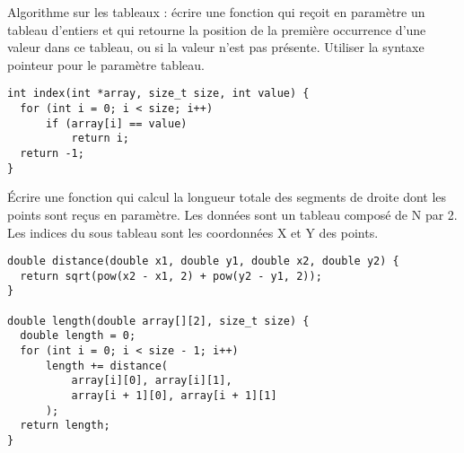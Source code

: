 \documentclass[french,a4paper,addpoints,11pt]{exam}
\begin{document}
\begin{questions}
\question Algorithme sur les tableaux : écrire une fonction qui reçoit en paramètre un tableau d'entiers et qui retourne la position de la première occurrence d'une valeur dans ce tableau, ou  si la valeur n'est pas présente. Utiliser la syntaxe pointeur pour le paramètre tableau.

\ifprintanswers
\begin{solution}
\begin{lstlisting}
int index(int *array, size_t size, int value) {
  for (int i = 0; i < size; i++)
      if (array[i] == value)
          return i;
  return -1;
}
\end{lstlisting}
\end{solution}
\else
\fillwithdottedlines{5cm}
\fi

\question
Écrire une fonction qui calcul la longueur totale des segments de droite dont les points sont reçus en paramètre. Les données sont un tableau composé de N par 2. Les indices du sous tableau sont les coordonnées X et Y des points.

\ifprintanswers
\begin{solution}
\begin{lstlisting}
double distance(double x1, double y1, double x2, double y2) {
  return sqrt(pow(x2 - x1, 2) + pow(y2 - y1, 2));
}

double length(double array[][2], size_t size) {
  double length = 0;
  for (int i = 0; i < size - 1; i++)
      length += distance(
          array[i][0], array[i][1],
          array[i + 1][0], array[i + 1][1]
      );
  return length;
}
\end{lstlisting}
\end{solution}
\else
\fillwithdottedlines{7cm}
\fi

\end{questions}
\end{document}

